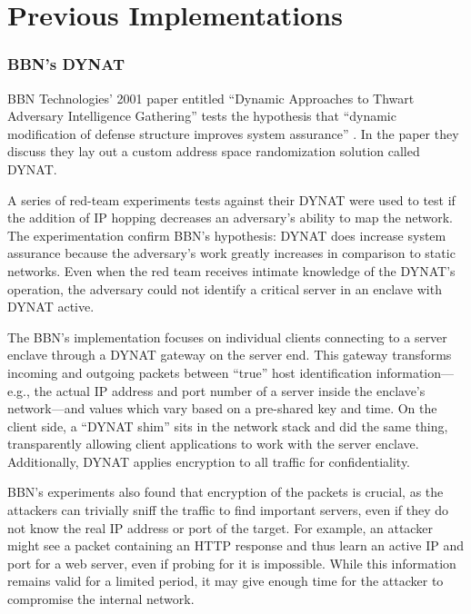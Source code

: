 \section{Previous Implementations}
\label{sec:related_research}
\subsubsection{BBN's \acf{DYNAT}}
\par BBN Technologies' 2001 paper entitled ``Dynamic Approaches to Thwart Adversary Intelligence Gathering'' tests the hypothesis that ``dynamic modification of defense structure improves system assurance'' \cite{BBNDYNAT}. In the paper they discuss they lay out a custom address space randomization solution called \ac{DYNAT}.

\par A series of red-team experiments tests against their \ac{DYNAT} were used to test if the addition of \ac{IP} hopping decreases an adversary's ability to map the network. The experimentation confirm BBN's hypothesis: DYNAT does increase system assurance because the adversary's work greatly increases in comparison to static networks. Even when the red team receives intimate knowledge of the DYNAT's operation, the adversary could not identify a critical server in an enclave with DYNAT active.

\par The BBN's implementation focuses on individual clients connecting to a server enclave through a DYNAT gateway on the server end. This gateway transforms incoming and outgoing packets between ``true'' host identification information---e.g., the actual \ac{IP} address and port number of a server inside the enclave's network---and values which vary based on a pre-shared key and time. On the client side, a ``DYNAT shim'' sits in the network stack and did the same thing, transparently allowing client applications to work with the server enclave. Additionally, DYNAT applies encryption to all traffic for confidentiality.

\par BBN's experiments also found that encryption of the packets is crucial, as the attackers can trivially sniff the traffic to find important servers, even if they do not know the real IP address or port of the target. For example, an attacker might see a packet containing an \ac{HTTP} response and thus learn an active IP and port for a web server, even if probing for it is impossible. While this information remains valid for a limited period, it may give enough time for the attacker to compromise the internal network.

